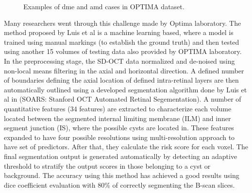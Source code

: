 \begin{figure}[t]
\begin{center}
   
\end{center}
    \caption{Examples of \acs{dme} and \acs{amd} cases in OPTIMA dataset.}
\end{figure}

Many researchers went through this challenge made by Optima laboratory.
The method proposed by Luis et al \cite{LuisdeSisternes2015Optima} is a machine learning based, where a model is trained using manual markings (to establish the ground truth) and then tested using another 15 volumes of testing data also provided by OPTIMA laboratory.
In the preprocessing stage, the SD-OCT data normalized and de-noised using non-local means filtering in the axial and horizontal direction.
A defined number of boundaries defining the axial location of defined intra-retinal layers are then automatically outlined using a developed segmentation algorithm done by Luis et al in \cite{de2015localization} (SOARS: Stanford OCT Automated Retinal Segementation).
A number of quantitative features (34 features) are extracted to characterize each volume located between the segmented internal limiting membrane (ILM) and inner segment junction (IS), where the possible cysts are located in.
These features expanded to have four possible resolutions using multi-resolution approach to have set of predictors. 
After that, they calculate the risk score for each voxel.
The final segmentation output is generated automatically by detecting an adaptive threshold to
stratify the output scores in those belonging to a cyst or background.
The accuracy using this method has achieved a good results using dice coefficient evaluation with 80\% of correctly segmenting the B-scan slices.

